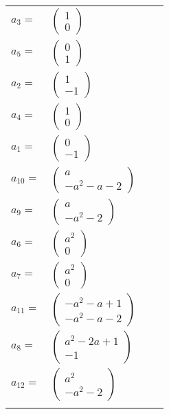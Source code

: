 \documentclass[1p]{elsarticle_modified}
\theoremstyle{definition}
\begin{document}
\begin{tabular}{m{7pt} m{180pt} m{7pt} m{180pt} }
\flushright $a_{3}=$&$\begin{pmatrix}1\\0\end{pmatrix}$ \\
\flushright $a_{5}=$&$\begin{pmatrix}0\\1\end{pmatrix}$ \\
\flushright $a_{2}=$&$\begin{pmatrix}1\\-1\end{pmatrix}$ \\
\flushright $a_{4}=$&$\begin{pmatrix}1\\0\end{pmatrix}$ \\
\flushright $a_{1}=$&$\begin{pmatrix}0\\-1\end{pmatrix}$ \\
\flushright $a_{10}=$&$\begin{pmatrix}a\\- a^2- a-2\end{pmatrix}$ \\
\flushright $a_{9}=$&$\begin{pmatrix}a\\- a^2-2\end{pmatrix}$ \\
\flushright $a_{6}=$&$\begin{pmatrix}a^2\\0\end{pmatrix}$ \\
\flushright $a_{7}=$&$\begin{pmatrix}a^2\\0\end{pmatrix}$ \\
\flushright $a_{11}=$&$\begin{pmatrix}- a^2- a+1\\- a^2- a-2\end{pmatrix}$ \\
\flushright $a_{8}=$&$\begin{pmatrix}a^2-2 a+1\\-1\end{pmatrix}$ \\
\flushright $a_{12}=$&$\begin{pmatrix}a^2\\- a^2-2\end{pmatrix}$\\&\end{tabular}
\end{document}
